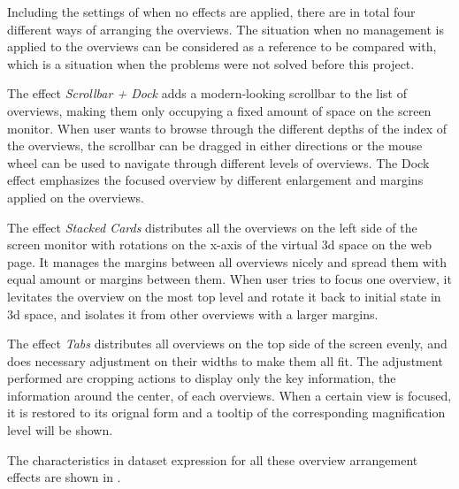 Including the settings of when no effects are applied, there are in total four different ways of arranging the overviews. The situation when no management is applied to the overviews can be considered as a reference to be compared with, which is a situation when the problems were not solved before this project.

The effect \emph{Scrollbar + Dock} adds a modern-looking scrollbar to the list of overviews, making them only occupying a fixed amount of space on the screen monitor. When user wants to browse through the different depths of the index of the overviews, the scrollbar can be dragged in either directions or the mouse wheel can be used to navigate through different levels of overviews. The Dock effect emphasizes the focused overview by different enlargement and margins applied on the overviews.

The effect \emph{Stacked Cards} distributes all the overviews on the left side of the screen monitor with rotations on the x-axis of the virtual 3d space on the web page. It manages the margins between all overviews nicely and spread them with equal amount or margins between them. When user tries to focus one overview, it levitates the overview on the most top level and rotate it back to initial state in 3d space, and isolates it from other overviews with a larger margins.

The effect \emph{Tabs} distributes all overviews on the top side of the screen evenly, and does necessary adjustment on their widths to make them all fit. The adjustment performed are cropping actions to display only the key information, the information around the center, of each overviews. When a certain view is focused, it is restored to its orignal form and a tooltip of the corresponding magnification level will be shown.

The characteristics in dataset expression for all these overview arrangement effects are shown in .


